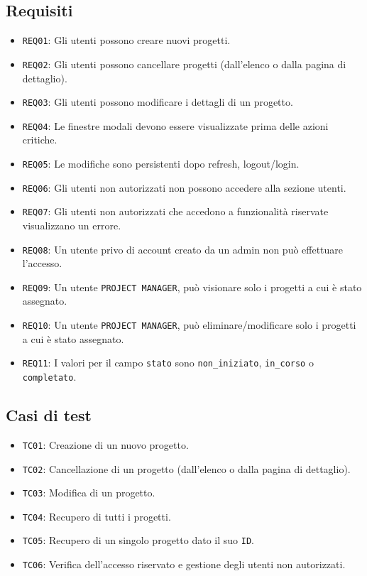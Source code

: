\documentclass[target=bach,aauheader=,style=]{thud}
\begin{document}
\subsection{Requisiti}\label{reqs}
\begin{itemize}
    \item \texttt{REQ01}: Gli utenti possono creare nuovi progetti.
    \item \texttt{REQ02}: Gli utenti possono cancellare progetti (dall'elenco o dalla pagina di dettaglio).
    \item \texttt{REQ03}: Gli utenti possono modificare i dettagli di un progetto.
    \item \texttt{REQ04}: Le finestre modali devono essere visualizzate prima delle azioni critiche.
    \item \texttt{REQ05}: Le modifiche sono persistenti dopo refresh, logout/login.
    \item \texttt{REQ06}: Gli utenti non autorizzati non possono accedere alla sezione utenti.
    \item \texttt{REQ07}: Gli utenti non autorizzati che accedono a funzionalità riservate visualizzano un errore.
    \item \texttt{REQ08}: Un utente privo di account creato da un admin non può effettuare l'accesso.
    \item \texttt{REQ09}: Un utente \texttt{PROJECT MANAGER}, può visionare solo i progetti a cui è stato assegnato.
    \item \texttt{REQ10}: Un utente \texttt{PROJECT MANAGER}, può eliminare/modificare solo i progetti a cui è stato assegnato.
    \item \texttt{REQ11}: I valori per il campo \texttt{stato} sono \texttt{non\_iniziato}, \texttt{in\_corso} o \texttt{completato}.
\end{itemize}

\subsection{Casi di test}
\begin{itemize}
     \item \texttt{TC01}: Creazione di un nuovo progetto.
     \item \texttt{TC02}: Cancellazione di un progetto (dall'elenco o dalla pagina di dettaglio).
     \item \texttt{TC03}: Modifica di un progetto.
     \item \texttt{TC04}: Recupero di tutti i progetti.
     \item \texttt{TC05}: Recupero di un singolo progetto dato il suo \texttt{ID}.
     \item \texttt{TC06}: Verifica dell'accesso riservato e gestione degli utenti non autorizzati.
\end{itemize}
\end{document}
